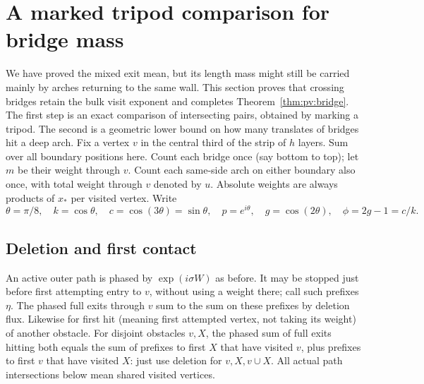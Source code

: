 \section{A marked tripod comparison for bridge mass}\label{c01-c1-transfer-to-bridges}

We have proved the mixed exit mean, but its length mass might still be carried mainly by arches returning to the same wall. This section proves that crossing bridges retain the bulk visit exponent and completes Theorem~\ref{thm:pv:bridge}. The first step is an exact comparison of intersecting pairs, obtained by marking a tripod. The second is a geometric lower bound on how many translates of bridges hit a deep arch. Fix a vertex \(v\) in the central third of the strip of \(h\) layers. Sum over all boundary positions here. Count each bridge once (say bottom to top); let \(m\) be their weight through \(v\). Count each same-side arch on either boundary also once, with total weight through \(v\) denoted by \(u\). Absolute weights are always products of \(x_*\) per visited vertex. Write
\[
 \theta=\pi/8,\quad k=\cos\theta,\quad c=\cos(3\theta)=\sin\theta,\quad
 p=e^{i\theta},\quad g=\cos(2\theta),\quad \phi=2g-1=c/k .
\]
\subsection{Deletion and first contact}

An active outer path is phased by \(\exp(i\sigma W)\) as before. It may be stopped just before first attempting entry to \(v\), without using a weight there; call such prefixes \(\eta\). The phased full exits through \(v\) sum to the sum on these prefixes by deletion flux. Likewise for first hit (meaning first attempted vertex, not taking its weight) of another obstacle. For disjoint obstacles \(v,X\), the phased sum of full exits hitting both equals the sum of prefixes to first \(X\) that have visited \(v\), plus prefixes to first \(v\) that have visited \(X\): just use deletion for \(v,X,v\cup X\). All actual path intersections below mean shared visited vertices.

